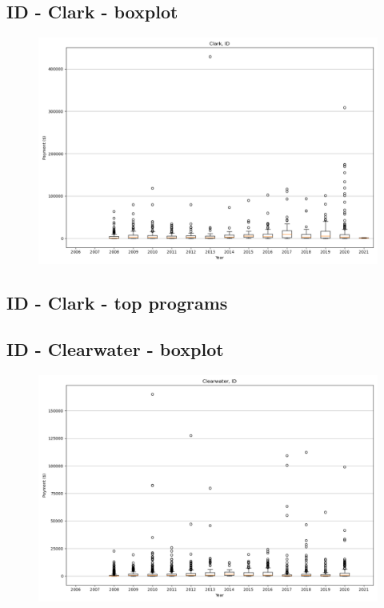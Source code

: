 \subsection*{ID - Clark - boxplot}
\begin{figure}[h]
\centering
\includegraphics[width=7in]{../output/boxplots/counties/Clark-ID_boxplot.png}
\end{figure}


\subsection*{ID - Clark - top programs}

\newpage
\subsection*{ID - Clearwater - boxplot}
\begin{figure}[h]
\centering
\includegraphics[width=7in]{../output/boxplots/counties/Clearwater-ID_boxplot.png}
\end{figure}


